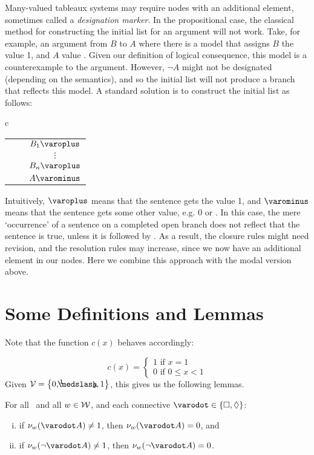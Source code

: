 Many-valued tableaux systems may require nodes with an additional element, sometimes called a \emph{designation marker}. In the propositional case, the classical method for constructing the initial list for an argument will not work. Take, for example, an argument from $B$ to $A$ where there is a model that assigns $B$ the value 1, and $A$ value \oneHalf. Given our definition of logical consequence, this model is a counterexample to the argument. However, $\neg A$ might not be designated (depending on the semantics), and so the initial list will not produce a branch that reflects this model. A standard solution is to construct the initial list as follows:
\vspace*{-12pt}
\begin{longtable}{c}
\begin{tabular}{ c c c }
\\
& & $ B_1\des $ \\
& & $\vdots$ \\
& & $ B_n\des $ \\
& & $ A\undes  $\\
\end{tabular}
\end{longtable}
\noindent Intuitively, $\des$ means that the sentence gets the value 1, and $\undes$ means that the sentence gets some other value, e.g. 0 or \oneHalf. In this case, the mere `occurrence' of a sentence on a completed open branch does not reflect that the sentence is true, unless it is followed by \des. As a result, the closure rules might need revision, and the resolution rules may increase, since we now have an additional element in our nodes. Here we combine this approach with the modal version above.

\section{Some Definitions and Lemmas}
	

Note that the function $ c(x) $ behaves accordingly:

\[c(x) = 
\begin{cases} 
	1 \text{ if } x = 1 \\
	0 \text{ if } 0 \leq x < 1
\end{cases}
\]
%
Given $ \Values = \set{0, \oneHalf, 1}$, this gives us the following lemmas.

\begin{lem}\label{modalLemma}
	For all \Model\ and all $w \in \mathcal{W}$, and each connective $ \varodot \in \set{ \Box, \Diam } $:
	\begin{enumerate}[(i)]
		\item if $\Valw{ w }{ \varodot A } \neq 1 $, then $ \Valw{ w }{ \varodot A } = 0 $, and
		\item if $\Valw{ w }{ \neg \varodot A } \neq 1 $, then $ \Valw{ w }{ \neg \varodot A } = 0 $.
	\end{enumerate}
\end{lem}

